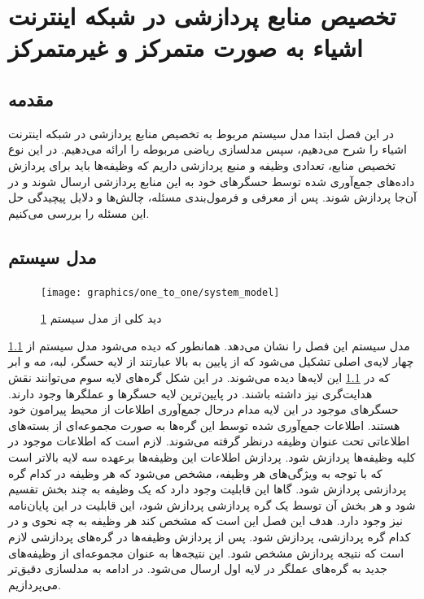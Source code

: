 \chapter{تخصیص منابع پردازشی در شبکه اینترنت اشیاء به صورت متمرکز و غیرمتمرکز}\label{chap:3-system_model_centralized_decentralized}
  \thispagestyle{empty}
  \section{مقدمه}
	در این فصل ابتدا مدل سیستم مربوط به تخصیص منابع پردازشی در شبکه اینترنت اشیاء را شرح می‌دهیم، سپس مدلسازی ریاضی مربوطه را ارائه می‌دهیم.
    در این نوع تخصیص منابع، تعدادی وظیفه و منبع پردازشی داریم که وظیفه‌ها باید برای پردازش داده‌های جمع‌آوری شده توسط حسگر‌های خود به این منابع پردازشی ارسال شوند و در آن‌جا پردازش شوند.
پس از معرفی و فرمول‌بندی مسئله، چالش‌ها و دلایل پیچیدگی حل این مسئله را بررسی می‌کنیم.
  \section{مدل سیستم}
    \begin{figure}[h]
      \centerline{\texttt{[image: graphics/one\_to\_one/system\_model]}}
      \caption{دید کلی از مدل سیستم \cref{chap:3-system_model_centralized_decentralized}}
      \label{fig:system_model}
    \end{figure}

	    \cref{fig:system_model} مدل سیستم این فصل را نشان می‌دهد.
	    همانطور که دیده می‌شود مدل سیستم از چهار لایه‌ی اصلی تشکیل می‌شود که از پایین به بالا عبارتند از لایه حسگر، لبه، مه و ابر که در \cref{fig:system_model} این لایه‌ها دیده می‌شوند. در این شکل گره‌های لایه سوم می‌توانند نقش هدایت‌گری نیز داشته باشند.
	در پایین‌ترین لایه حسگرها و عملگرها وجود دارند. حسگرهای موجود در این لایه مدام درحال جمع‌آوری اطلاعات از محیط پیرامون خود هستند. اطلاعات جمع‌آوری شده توسط این گره‌ها به صورت مجموعه‌ای از بسته‌های اطلاعاتی تحت عنوان وظیفه درنظر گرفته می‌شوند. 
	لازم است که اطلاعات موجود در کلیه وظیفه‌ها پردازش شود. پردازش اطلاعات این وظیفه‌ها برعهده سه لایه بالاتر است که با توجه به ویژگی‌های هر وظیفه، مشخص می‌شود که هر وظیفه در کدام گره پردازشی پردازش شود.
	گاها این قابلیت وجود دارد که یک وظیفه به چند بخش تقسیم شود و هر بخش آن توسط یک گره پردازشی پردازش شود، این قابلیت در این پایان‌نامه نیز وجود دارد. هدف این فصل این است که مشخص کند هر وظیفه به چه نحوی و در کدام گره پردازشی، پردازش شود. پس از پردازش وظیفه‌ها در گره‌های پردازشی لازم است که نتیجه پردازش مشخص شود. این نتیجه‌ها به عنوان مجموعه‌ای از وظیفه‌های جدید به گره‌های عملگر در لایه اول ارسال می‌شود. در ادامه به مدلسازی دقیق‌تر می‌پردازیم.
	

